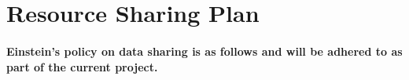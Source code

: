 

\section{Resource Sharing Plan}
\lipsum[1-4]
\paragraph{Einstein’s policy on data sharing is as follows and will be adhered to as part of the current project.} \lipsum[5-5]